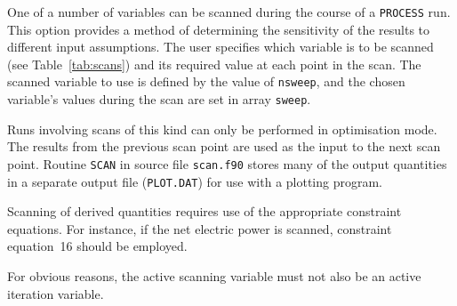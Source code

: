 \documentclass[11pt,a4paper]{report}
\newcommand{\process}{\mbox{\texttt{PROCESS}}}
\begin{document}
One of a number of variables can be scanned during the course of a \process\/
run.  This option provides a method of determining the sensitivity of the
results to different input assumptions. The user specifies which variable is
to be scanned (see Table~\ref{tab:scans}) and its required value at each point
in the scan. The scanned variable to use is defined by the value of
\texttt{nsweep}, and the chosen variable's values during the scan are set in
array \texttt{sweep}.

Runs involving scans of this kind can only be performed in optimisation mode.
The results from the previous scan point are used as the input to the next
scan point. Routine \texttt{SCAN} in source file \texttt{scan.f90} stores many
of the output quantities in a separate output file (\texttt{PLOT.DAT}) for use
with a plotting program.

Scanning of derived quantities requires use of the appropriate constraint
equations. For instance, if the net electric power is scanned, constraint
equation~16 should be employed.

For obvious reasons, the active scanning variable must not also be an active
iteration variable.

\end{document}
